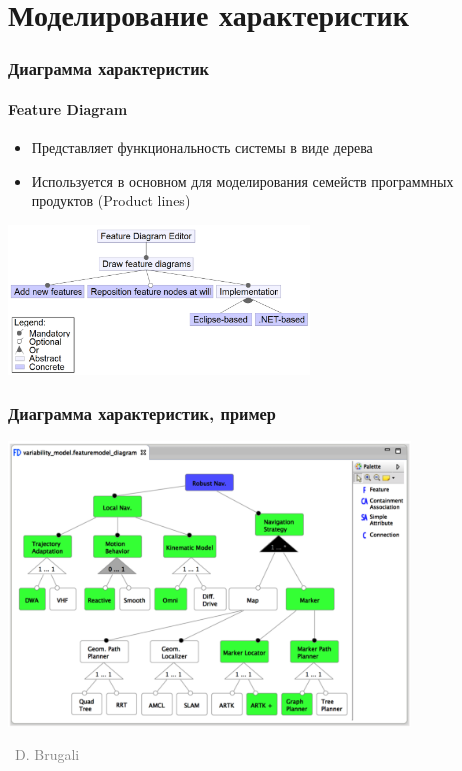 \documentclass[xetex,mathserif,serif]{beamer}
\newcommand{\attribution}[1] {
    \vspace{-5mm}\begin{flushright}\begin{scriptsize}\textcolor{gray}{\textcopyright\, #1}\end{scriptsize}\end{flushright}
}
\begin{document}
    \section{Моделирование характеристик}

    \begin{frame}
        \frametitle{Диаграмма характеристик}
        \framesubtitle{Feature Diagram}
        \begin{itemize}
            \item Представляет функциональность системы в виде дерева
            \item Используется в основном для моделирования семейств программных продуктов (Product lines)
        \end{itemize}
        \begin{center}
            \includegraphics[width=0.6\textwidth]{featureDiagram.png}
        \end{center}
    \end{frame}

    \begin{frame}
        \frametitle{Диаграмма характеристик, пример}
        \begin{center}
            \includegraphics[width=0.8\textwidth]{featureDiagramExample.png}
            \attribution{D. Brugali}
        \end{center}
    \end{frame}
\end{document}
